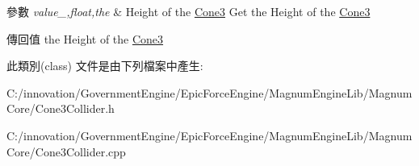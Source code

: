 \begin{DoxyParams}{參數}
{\em value\+\_\+,float,the} & Height of the \hyperlink{class_i_dream_sky_1_1_cone3}{Cone3} Get the Height of the \hyperlink{class_i_dream_sky_1_1_cone3}{Cone3} \\
\hline
\end{DoxyParams}
\begin{DoxyReturn}{傳回值}
the Height of the \hyperlink{class_i_dream_sky_1_1_cone3}{Cone3} 
\end{DoxyReturn}


此類別(class) 文件是由下列檔案中產生\+:\begin{DoxyCompactItemize}
\item 
C\+:/innovation/\+Government\+Engine/\+Epic\+Force\+Engine/\+Magnum\+Engine\+Lib/\+Magnum\+Core/Cone3\+Collider.\+h\item 
C\+:/innovation/\+Government\+Engine/\+Epic\+Force\+Engine/\+Magnum\+Engine\+Lib/\+Magnum\+Core/Cone3\+Collider.\+cpp\end{DoxyCompactItemize}
